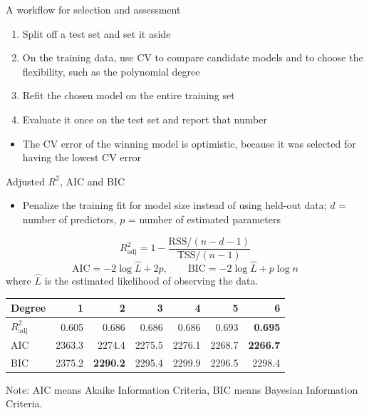 \begin{frame}{A workflow for selection and assessment}
    \begin{enumerate}
        \item Split off a test set and set it aside
        \item On the training data, use CV to compare candidate models and to choose the flexibility, such as the polynomial degree
        \item Refit the chosen model on the entire training set
        \item Evaluate it once on the test set and report that number
    \end{enumerate}
    \begin{itemize}
        \item The CV error of the winning model is optimistic, because it was selected for having the lowest CV error
    \end{itemize}
\end{frame}


\begin{frame}{Adjusted $R^2$, AIC and BIC}
    \begin{itemize}
        \item Penalize the training fit for model size instead of using held-out data; $d$ = number of predictors, $p$ = number of estimated parameters
    \end{itemize}
    \[
        R^2_{\text{adj}} = 1 - \frac{\mathrm{RSS}/(n - d - 1)}{\mathrm{TSS}/(n - 1)}
    \]
    \[
        \mathrm{AIC} = -2\log\hat{L} + 2p,
        \qquad
        \mathrm{BIC} = -2\log\hat{L} + p\log n
    \]
    where \(\hat{L}\) is the estimated likelihood of observing the data.
    \begin{center}
        \begin{tabular}{@{}lrrrrrr@{}}
            \toprule
            Degree & 1 & 2 & 3 & 4 & 5 & 6 \\
            \midrule
            $R^2_{\text{adj}}$ & 0.605 & 0.686 & 0.686 & 0.686 & 0.693 & \textbf{0.695} \\
            AIC & 2363.3 & 2274.4 & 2275.5 & 2276.1 & 2268.7 & \textbf{2266.7} \\
            BIC & 2375.2 & \textbf{2290.2} & 2295.4 & 2299.9 & 2296.5 & 2298.4 \\
            \bottomrule
        \end{tabular}
    \end{center}
    Note: AIC means Akaike Information Criteria, BIC means Bayesian Information Criteria.
\end{frame}


